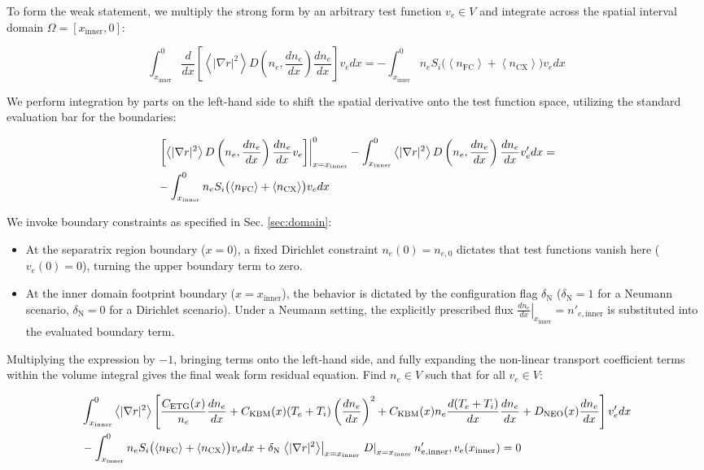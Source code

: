 \documentclass[twocolumn,secnumarabic,amssymb, nobibnotes, aps, prd]{revtex4-2}
\renewcommand{\ne}{n_{e}}  %
\newcommand{\nfc}{n_{\mathrm{FC}}}
\newcommand{\ncx}{n_{\mathrm{CX}}}
\newcommand{\Si}{S_{i}}
\newcommand{\fsa}[1]{\left\langle #1 \right\rangle}
\newcommand{\gradrsq}{\fsa{|\nabla r|^{2}}}
\newcommand{\xin}{x_{\mathrm{inner}}}
\begin{document}
To form the weak statement, we multiply the strong form by an arbitrary test function $v_e \in V$ and integrate across the spatial interval domain $\Omega = [\xin, 0]$:
\begin{widetext}
\begin{equation}
\int_{\xin}^{0} \frac{d}{dx}\left[\gradrsq D\left(\ne, \frac{d\ne}{dx}\right) \frac{d\ne}{dx}\right] v_e  dx = -\int_{\xin}^{0} \ne\Si\bigl(\fsa{\nfc} + \fsa{\ncx}\bigr) v_e dx
\end{equation}
\end{widetext}

We perform integration by parts on the left-hand side to shift the spatial derivative onto the test function space, utilizing the standard evaluation bar for the boundaries:
\begin{widetext}
\begin{align}
&\left. \left[\gradrsq D\left(\ne, \frac{d\ne}{dx}\right) \frac{d\ne}{dx} v_e\right] \right|_{x=\xin}^{0} - \int_{\xin}^{0} \gradrsq D\left(\ne, \frac{d\ne}{dx}\right) \frac{d\ne}{dx} v_e' dx = 
\notag \\ & -\int_{\xin}^{0} \ne\Si\bigl(\fsa{\nfc} + \fsa{\ncx}\bigr) v_e  dx
\end{align}
\end{widetext}

We invoke boundary constraints as specified in Sec. \ref{sec:domain}:
\begin{itemize}
\item At the separatrix region boundary ($x=0$), a fixed Dirichlet constraint $\ne(0) = n_{e,0}$ dictates that test functions vanish here ($v_e(0) = 0$), turning the upper boundary term to zero.
\item At the inner domain footprint boundary ($x=\xin$), the behavior is dictated by the configuration flag $\delta_{\mathrm{N}}$ ($\delta_{\mathrm{N}}=1$ for a Neumann scenario, $\delta_{\mathrm{N}}=0$ for a Dirichlet scenario). Under a Neumann setting, the explicitly prescribed flux $\left.\frac{d\ne}{dx}\right|_{\xin} = n'_{e,\mathrm{inner}}$ is substituted into the evaluated boundary term.
\end{itemize}

Multiplying the expression by $-1$, bringing terms onto the left-hand side, and fully expanding the non-linear transport coefficient terms within the volume integral gives the final weak form residual equation. Find $\ne \in V$ such that for all $v_e \in V$:
\begin{widetext}
\begin{align}
&\int_{\xin}^{0} \gradrsq \left[ \frac{C_{\mathrm{ETG}}(x)}{\ne} \frac{d\ne}{dx} + C_{\mathrm{KBM}}(x) (T_e + T_i) \left(\frac{d\ne}{dx}\right)^2 + C_{\mathrm{KBM}}(x) \ne \frac{d(T_e + T_i)}{dx} \frac{d\ne}{dx} + D_{\mathrm{NEO}}(x) \frac{d\ne}{dx} \right] v_e'  dx 
\notag \\ & - \int_{\xin}^{0} \ne\Si\bigl(\fsa{\nfc}+\fsa{\ncx}\bigr) v_e dx + \delta_{\mathrm{N}}\left. \gradrsq\right|_{x=\xin} \left. D \right|_{x=\xin} n'_{e,\mathrm{inner}}, v_e(\xin) = 0
\end{align}
\end{widetext}
\end{document}

